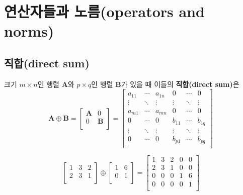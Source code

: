\documentclass[b5paper,]{scrbook}
\theoremstyle{plain}
\theoremstyle{definition}
\numberwithin{equation}{section}
\let\BeginKnitrBlock\begin \let\EndKnitrBlock\end
\begin{document}
\hypertarget{-operators-and-norms}{%
\section{연산자들과 노름(operators and norms)}\label{-operators-and-norms}}

\hypertarget{direct-sum}{%
\subsection{직합(direct sum)}\label{direct-sum}}

\BeginKnitrBlock{definition}[직합]
\protect\hypertarget{def:unnamed-chunk-8}{}{\label{def:unnamed-chunk-8} {} }크기 \(m \times n\)인 행렬 \(\mathbf{A}\)와 \(p\times q\)인 행렬 \(\mathbf{B}\)가 있을 때 이들의 \textbf{직합(direct sum)}은
\[\mathbf{A}\oplus\mathbf{B}=
\begin{bmatrix}
\mathbf{A} & 0\\
0 & \mathbf{B}\\
\end{bmatrix}
=
\begin{bmatrix}
a_{11} & \cdots & a_{1n} & 0 & \cdots & 0 \\
\vdots & \ddots & \vdots & \vdots & \ddots & \vdots \\
a_{m1} & \cdots & a_{mn} & 0 & \cdots & 0 \\
0 & \cdots & 0 & b_{11} & \cdots & b_{1q} \\
\vdots & \ddots & \vdots & \vdots & \ddots & \vdots \\
0 & \cdots & 0 & b_{p1} & \cdots & b_{pq} \\
\end{bmatrix}
\]
\EndKnitrBlock{definition}

\BeginKnitrBlock{example}[직합의 예]
\protect\hypertarget{exm:unnamed-chunk-9}{}{\label{exm:unnamed-chunk-9} {} }\[
\begin{bmatrix}
1 & 3 & 2\\
2 & 3 & 1\\
\end{bmatrix}
\oplus
\begin{bmatrix}
1 & 6\\
0 & 1\\
\end{bmatrix}
=
\begin{bmatrix}
1 & 3 & 2 & 0 & 0\\
2 & 3 & 1 & 0 & 0\\
0 & 0 & 0 & 1 & 6\\
0 & 0 & 0 & 0 & 1\\
\end{bmatrix}
\]
\EndKnitrBlock{example}
\end{document}
